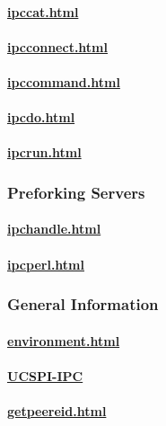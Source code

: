 \documentclass{book}
\begin{document}
\paragraph{\href{The \cmd{ipccat} program}{ipccat.html}}
\paragraph{\href{The \cmd{ipcconnect} program}{ipcconnect.html}}

\paragraph{\href{The \cmd{ipccommand} program}{ipccommand.html}}
\paragraph{\href{The \cmd{ipcdo} program}{ipcdo.html}}
\paragraph{\href{The \cmd{ipcrun} program}{ipcrun.html}}

\subsubsection{Preforking Servers}
\paragraph{\href{Compiling an \cmd{ipchandle} server}{ipchandle.html}}
\paragraph{\href{The \cmd{ipcperl} program}{ipcperl.html}}

\subsubsection{General Information}
\paragraph{\href{The ucspi-ipc environment variables}{environment.html}}
\paragraph{\href{The ucspi-ipc protocol description}{UCSPI-IPC}}

\paragraph{\href{\cmd{getpeereid}}{getpeereid.html}}
\end{document}
